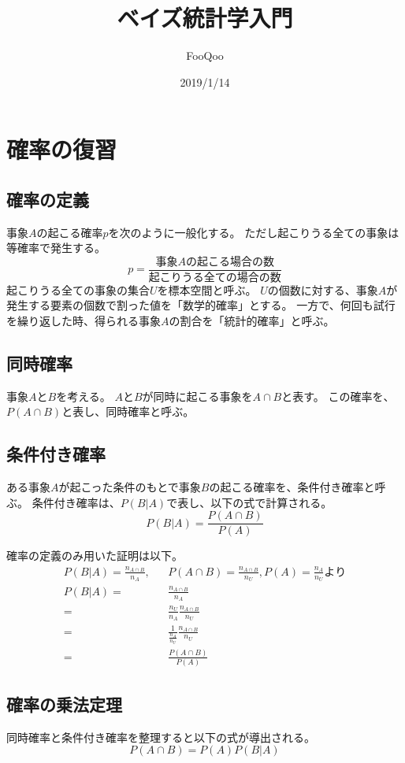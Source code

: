 \documentclass{ltjsarticle}
\title{ベイズ統計学入門}
\author{FooQoo}
\begin{document}
\date{2019/1/14}
\maketitle
\section{確率の復習}
\subsection{確率の定義}
事象$A$の起こる確率$p$を次のように一般化する。
ただし起こりうる全ての事象は等確率で発生する。
\begin{equation}
    p=\frac{事象Aの起こる場合の数}{起こりうる全ての場合の数}
\end{equation}
起こりうる全ての事象の集合$U$を標本空間と呼ぶ。
$U$の個数に対する、事象$A$が発生する要素の個数で割った値を「数学的確率」とする。
一方で、何回も試行を繰り返した時、得られる事象$A$の割合を「統計的確率」と呼ぶ。

\subsection{同時確率}
事象$A$と$B$を考える。
$A$と$B$が同時に起こる事象を$A \cap B$と表す。
この確率を、$P(A \cap B)$と表し、同時確率と呼ぶ。

\subsection{条件付き確率}
ある事象$A$が起こった条件のもとで事象$B$の起こる確率を、条件付き確率と呼ぶ。
条件付き確率は、$P(B|A)$で表し、以下の式で計算される。
\begin{equation}
    P(B|A)=\frac{P(A \cap B)}{P(A)}
\end{equation}

確率の定義のみ用いた証明は以下。
\begin{eqnarray}
    P(B|A)=\frac{n_{A \cap B}}{n_A}, & & P(A \cap B)=\frac{n_{A \cap B}}{n_U}, P(A)=\frac{n_A}{n_U}より \nonumber \\
    P(B|A)=& &\frac{n_{A \cap B}}{n_A} \\
    =& &\frac{n_U}{n_A} \frac{n_{A \cap B}}{n_U} \\
    =& &\frac{1}{\frac{n_A}{n_U}}\frac{n_{A \cap B}}{n_U} \\
    =& &\frac{P(A \cap B)}{P(A)}
\end{eqnarray}

\subsection{確率の乗法定理}
同時確率と条件付き確率を整理すると以下の式が導出される。
\begin{equation}
    P(A \cap B)=P(A) P(B|A)
\end{equation}
\end{document}
